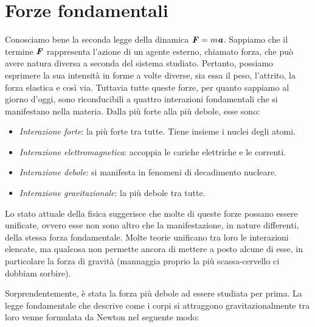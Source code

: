 \marginpar{\minitoc}

\section{Forze fondamentali}
Conosciamo bene la seconda legge della dinamica $\textbf{\textit{F}} = m\textbf{\textit{a}}$.
Sappiamo che il termine $\textbf{\textit{F}}$ rappresenta l'azione di un agente esterno,
chiamato forza, che può avere natura diversa a seconda del sistema studiato.
Pertanto, possiamo esprimere
la sua intensità in forme a volte diverse, sia essa il peso, l'attrito, la
forza elastica e così via. Tuttavia tutte queste forze, per quanto sappiamo al
giorno d'oggi, sono riconducibili a quattro interazioni fondamentali che si
manifestano nella materia. Dalla più forte alla più debole, esse
sono:
\begin{itemize}
    \item \textit{Interazione forte}: la più forte tra tutte. Tiene insieme i nuclei
    degli atomi.

    \item \textit{Interazione elettromagnetica}: accoppia le cariche elettriche e
    le correnti.

    \item \textit{Interazione debole}: si manifesta in fenomeni di decadimento nucleare.
    
    \item \textit{Interazione gravitazionale}: la più debole tra tutte.
\end{itemize}
Lo stato attuale della fisica suggerisce che molte di queste forze possano essere
unificate, ovvero esse non sono altro che la manifestazione, in nature differenti,
della stessa forza fondamentale. Molte teorie unificano tra loro le interazioni
elencate, ma qualcosa non permette ancora di mettere a posto alcune di esse,
in particolare la forza di gravità (mannaggia proprio la più scassa-cervello ci
dobbiam sorbire).

Sorprendentemente, è stata la forza più debole ad essere studiata per prima.
La legge fondamentale che descrive come i corpi si attraggono gravitazionalmente tra
loro venne formulata da Newton nel seguente modo:

